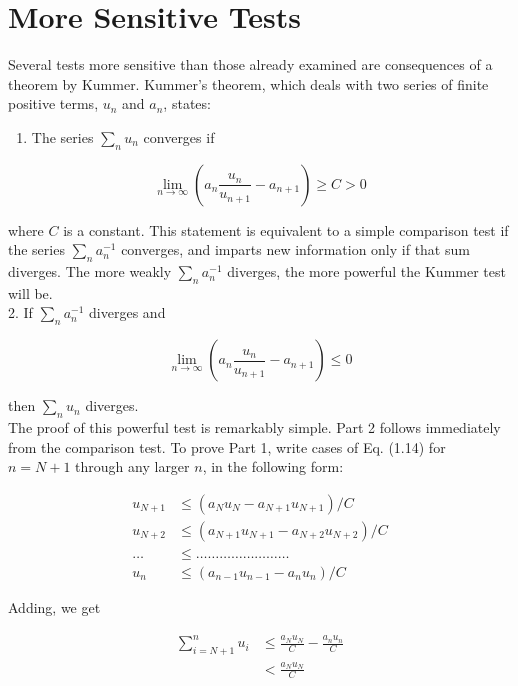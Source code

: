 \documentclass[10pt]{article}
\begin{document}
\section*{More Sensitive Tests}
Several tests more sensitive than those already examined are consequences of a theorem by Kummer. Kummer's theorem, which deals with two series of finite positive terms, $u_{n}$ and $a_{n}$, states:

\begin{enumerate}
  \item The series $\sum_{n} u_{n}$ converges if
\end{enumerate}


\begin{equation*}
\lim _{n \rightarrow \infty}\left(a_{n} \frac{u_{n}}{u_{n+1}}-a_{n+1}\right) \geq C>0 \tag{1.14}
\end{equation*}


where $C$ is a constant. This statement is equivalent to a simple comparison test if the series $\sum_{n} a_{n}^{-1}$ converges, and imparts new information only if that sum diverges. The more weakly $\sum_{n} a_{n}^{-1}$ diverges, the more powerful the Kummer test will be.\\
2. If $\sum_{n} a_{n}^{-1}$ diverges and


\begin{equation*}
\lim _{n \rightarrow \infty}\left(a_{n} \frac{u_{n}}{u_{n+1}}-a_{n+1}\right) \leq 0 \tag{1.15}
\end{equation*}


then $\sum_{n} u_{n}$ diverges.\\
The proof of this powerful test is remarkably simple. Part 2 follows immediately from the comparison test. To prove Part 1, write cases of Eq. (1.14) for $n=N+1$ through any larger $n$, in the following form:

$$
\begin{aligned}
u_{N+1} & \leq\left(a_{N} u_{N}-a_{N+1} u_{N+1}\right) / C \\
u_{N+2} & \leq\left(a_{N+1} u_{N+1}-a_{N+2} u_{N+2}\right) / C \\
\ldots & \leq \ldots \ldots \ldots \ldots \ldots \ldots \ldots \ldots \\
u_{n} & \leq\left(a_{n-1} u_{n-1}-a_{n} u_{n}\right) / C
\end{aligned}
$$

Adding, we get


\begin{align*}
\sum_{i=N+1}^{n} u_{i} & \leq \frac{a_{N} u_{N}}{C}-\frac{a_{n} u_{n}}{C}  \tag{1.16}\\
& <\frac{a_{N} u_{N}}{C} \tag{1.17}
\end{align*}
\end{document}
